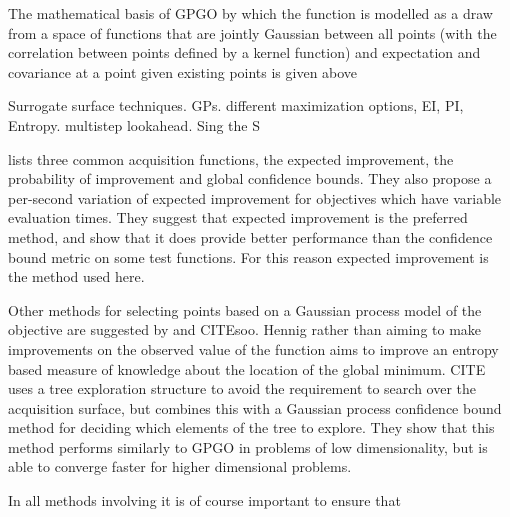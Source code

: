 \documentclass[a4paper, 10 pt, conference]{ieeeconf}  %
\begin{document}
The mathematical basis of GPGO by which the function is modelled as a draw from a space of functions that are jointly Gaussian between all points (with the correlation between points defined by a kernel function) and expectation and covariance at a point given existing points is given above

Surrogate surface techniques. GPs. different maximization options, EI, PI, Entropy. multistep lookahead. Sing the S

\cite{snoek2012practical} lists three common acquisition functions, the expected improvement, the probability of improvement and global confidence bounds. They also propose a per-second variation of expected improvement for objectives which have variable evaluation times. They suggest that expected improvement is the preferred method, and show that it does provide better performance than the confidence bound metric on some test functions. For this reason expected improvement is the method used here.

Other methods for selecting points based on a Gaussian process model of the objective are suggested by \cite{hennig2012entropy} and CITEsoo. Hennig rather than aiming to make improvements on the observed value of the function aims to improve an entropy based measure of knowledge about the location of the global minimum. CITE uses a tree exploration structure to avoid the requirement to search over the acquisition surface, but combines this with a Gaussian process confidence bound method for deciding which elements of the tree to explore. They show that this method performs similarly to GPGO in problems of low dimensionality, but is able to converge faster for higher dimensional problems.

In all methods involving it is of course important to ensure that
\end{document}
